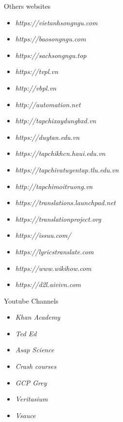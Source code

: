 \documentclass[11pt]{article}
\begin{document}
Others websites
\begin{itemize}
\color{darkblue}
\item \textsl{https://vietanhsongngu.com }
\item \textsl{https://baosongngu.com}
\item \textsl{https://sachsongngu.top}
\item \textsl{https://tvpl.vn}
\item \textsl{http://vbpl.vn}
\item \textsl{http://automation.net}
\item \textsl{http://tapchixaydungbxd.vn}
\item \textsl{https://duytan.edu.vn}
\item \textsl{https://tapchikhcn.haui.edu.vn}
\item \textsl{https://tapchivatuyentap.tlu.edu.vn}
\item \textsl{http://tapchimoitruong.vn}
\item \textsl{https://translations.launchpad.net}
\item \textsl{https://translationproject.org}
\item \textsl{https://issuu.com/}
\item \textsl{https://lyricstranslate.com}
\item \textsl{https://www.wikihow.com}
\item \textsl{https://d2l.aivivn.com}
\end{itemize}
Youtube Channels
\begin{itemize}
\color{darkblue}
\item \textsl{Khan Academy }
\item \textsl{Ted Ed}
\item \textsl{Asap Science}
\item \textsl{Crash courses}
\item \textsl{GCP Grey}
\item \textsl{Veritasium}
\item \textsl{Vsauce}  
\end{itemize}
\end{document}

